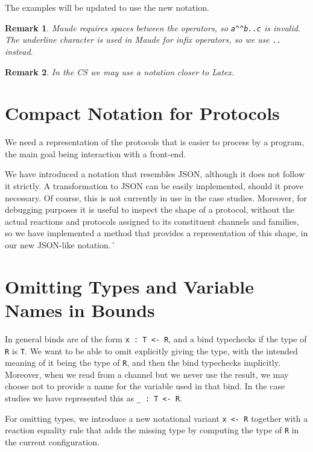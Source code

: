 \documentclass{article}
\newtheorem{remark}{Remark}
\begin{document}
The examples will be updated to use the new notation.

\begin{remark}
Maude requires spaces between the operators, so \verb+a^^b..c+ is invalid. 
The underline character is used in Maude for infix operators, so we use \verb+..+ instead.
\end{remark}

\begin{remark}
In the CS we may use a notation closer to Latex.
\end{remark}

\section{Compact Notation for Protocols}

We need a representation of the protocols that is easier to process by a program, the main goal being interaction with a front-end.

We have introduced a notation that resembles JSON, although it does not follow it strictly. A transformation to JSON can be easily implemented, should it prove necessary. Of course, this is not currently in use in the case studies. Moreover, for debugging purposes it is useful to inspect the
shape of a protocol, without the actual reactions and protocols assigned to its constituent channels and families, so we have implemented a method that provides a representation of this shape, in our new JSON-like notation.´

\section{Omitting Types and Variable Names in Bounds}

In general binds are of the form \verb+x : T <- R+, and a bind typechecks if the type of \verb+R+ is \verb+T+. We want to be able to omit explicitly giving the type, with the intended meaning of it being the type of \verb+R+, and then the bind typechecks implicitly. Moreover, when we read 
from a channel but we never use the result, we may choose not to provide a 
name for the variable used in that bind. In the case studies we have represented this as \verb+_ : T <- R+.

For omitting types, we introduce a new notational variant \verb+x <- R+ 
together with a reaction equality rule that adds the missing type by 
computing the type of \verb+R+ in the current configuration. 
\end{document}
